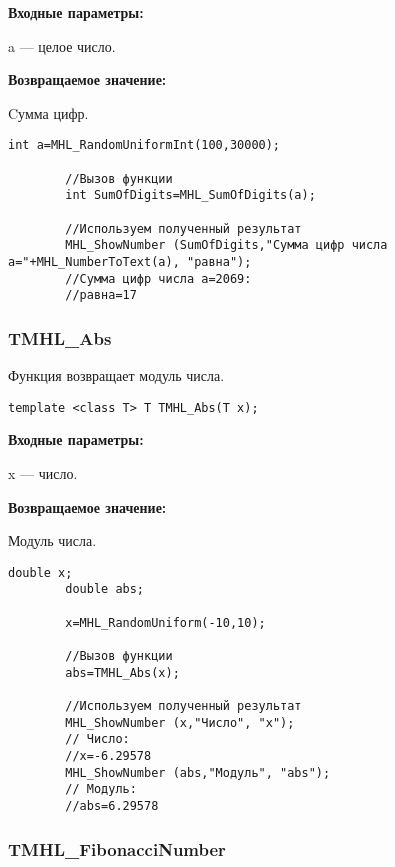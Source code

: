 \documentclass[a4paper,12pt]{article}
\begin{document}
\textbf{Входные параметры:}

a --- целое число.

\textbf{Возвращаемое значение:}

Cумма цифр.


\begin{lstlisting}[label=code_use_MHL_SumOfDigits,caption=Пример использования]
        int a=MHL_RandomUniformInt(100,30000);

        //Вызов функции
        int SumOfDigits=MHL_SumOfDigits(a);

        //Используем полученный результат
        MHL_ShowNumber (SumOfDigits,"Сумма цифр числа a="+MHL_NumberToText(a), "равна");
        //Сумма цифр числа a=2069:
        //равна=17
\end{lstlisting}

\subsubsection{TMHL\_Abs}\label{TMHL_Abs}

Функция возвращает модуль числа.


\begin{lstlisting}[label=code_syntax_TMHL_Abs,caption=Синтаксис]
template <class T> T TMHL_Abs(T x);
\end{lstlisting}

\textbf{Входные параметры:}

 x --- число.
 
\textbf{Возвращаемое значение:}

 Модуль числа.


\begin{lstlisting}[label=code_use_TMHL_Abs,caption=Пример использования]
        double x;
        double abs;

        x=MHL_RandomUniform(-10,10);

        //Вызов функции
        abs=TMHL_Abs(x);

        //Используем полученный результат
        MHL_ShowNumber (x,"Число", "x");
        // Число:
        //x=-6.29578
        MHL_ShowNumber (abs,"Модуль", "abs");
        // Модуль:
        //abs=6.29578
\end{lstlisting}

\subsubsection{TMHL\_FibonacciNumber}\label{TMHL_FibonacciNumber}
\end{document}
